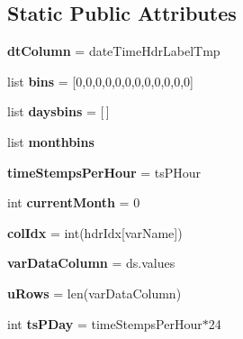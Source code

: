 \subsection*{Static Public Attributes}
\begin{DoxyCompactItemize}
\item 
\mbox{\label{class_f_plots_1_1_frm_plots_a905de1f0442aa2f9b320f4fd55ad8d90}} 
{\bfseries dt\+Column} = date\+Time\+Hdr\+Label\+Tmp
\item 
\mbox{\label{class_f_plots_1_1_frm_plots_a7ab0f6d3a0c198191854a5b4ff9a1ff6}} 
list {\bfseries bins} = \mbox{[}0,0,0,0,0,0,0,0,0,0,0,0\mbox{]}
\item 
\mbox{\label{class_f_plots_1_1_frm_plots_abb23226b0606d291cbeac8374b6000b6}} 
list {\bfseries daysbins} = \mbox{[}$\,$\mbox{]}
\item 
list {\bfseries monthbins}
\item 
\mbox{\label{class_f_plots_1_1_frm_plots_a9fe9e54545a2918d7880d0f08c1ef0d5}} 
{\bfseries time\+Stemps\+Per\+Hour} = ts\+P\+Hour
\item 
\mbox{\label{class_f_plots_1_1_frm_plots_aa1799ee00d00e47a040cc8ebda13ae23}} 
int {\bfseries current\+Month} = 0
\item 
\mbox{\label{class_f_plots_1_1_frm_plots_a441d18259b81b9ef72c53bff5b2d17ff}} 
{\bfseries col\+Idx} = int(hdr\+Idx\mbox{[}var\+Name\mbox{]})
\item 
\mbox{\label{class_f_plots_1_1_frm_plots_af8072deb5db6a6fe656c09364b86278c}} 
{\bfseries var\+Data\+Column} = ds.\+values
\item 
\mbox{\label{class_f_plots_1_1_frm_plots_a89b4c133fa55f46764febe283faace73}} 
{\bfseries u\+Rows} = len(var\+Data\+Column)
\item 
\mbox{\label{class_f_plots_1_1_frm_plots_a1c677dbb570becb97c7fc65c9eedb2a7}} 
int {\bfseries ts\+P\+Day} = time\+Stemps\+Per\+Hour$\ast$24

\end{DoxyCompactItemize}

